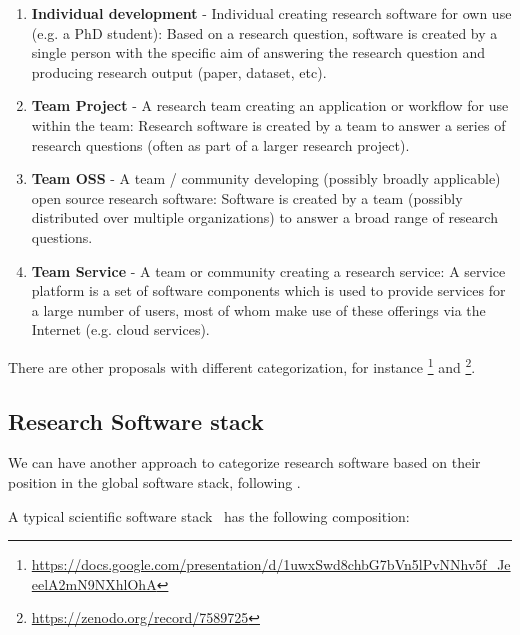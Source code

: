 \begin{enumerate}
    \item \textbf{Individual development} - Individual creating research software for own use (e.g. a PhD student): Based on a research question, software is created by a single person with the specific aim of answering the research question and producing research output (paper, dataset, etc).
    \item \textbf{Team Project} - A research team creating an application or workflow for use within the team: Research software is created by a team to answer a series of research questions (often as part of a larger research project).
    \item \textbf{Team OSS} - A team / community developing (possibly broadly applicable) open source research software: Software is created by a team (possibly distributed over multiple organizations) to answer a broad range of research questions.
    \item \textbf{Team Service} - A team or community creating a research service: A service platform is a set of software components which is used to provide services for a large number of users, most of whom make use of these offerings via the Internet (e.g. cloud services).
\end{enumerate}

There are other proposals with different categorization, for instance \footnote{\url{https://docs.google.com/presentation/d/1uwxSwd8chbG7bVn5lPvNNhv5f_JeeelA2mN9NXhlOhA}} and \footnote{\url{https://zenodo.org/record/7589725}}.

\subsection{Research Software stack}

We can have another approach to categorize research software based on
their position in the global software stack, following
\cite{hinsen2019}.

A typical scientific software stack~\cite{hinsen2019} has the following composition:


